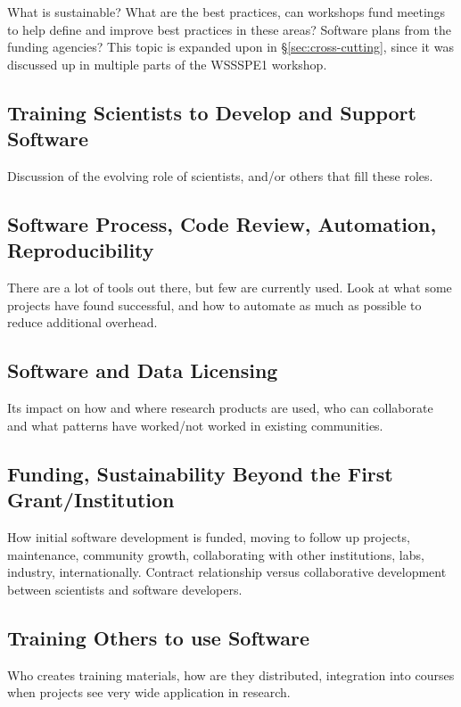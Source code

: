 \documentclass[11pt, oneside]{amsart}
\begin{document}
What is sustainable? What are the best practices, can workshops fund meetings to help define and improve best practices in these areas? Software plans from the funding agencies? This topic is expanded upon in \S\ref{sec:cross-cutting}, since it was discussed up in multiple parts of the WSSSPE1 workshop.

\subsection{Training Scientists to Develop and Support Software}

Discussion of the evolving role of scientists, and/or others that fill these roles.

\subsection{Software Process, Code Review, Automation, Reproducibility}

There are a lot of tools out there, but few are currently used. Look at what some projects have found successful, and how to automate as much as possible to reduce additional overhead.

\subsection{Software and Data Licensing}

Its impact on how and where research products are used, who can collaborate and what patterns have worked/not worked in existing communities.

\subsection{Funding, Sustainability Beyond the First Grant/Institution}

How initial software development is funded, moving to follow up projects, maintenance, community growth, collaborating with other institutions, labs, industry, internationally. Contract relationship versus collaborative development between scientists and software developers.

\subsection{Training Others to use Software}

Who creates training materials, how are they distributed, integration into courses when projects see very wide application in research.
\end{document}
